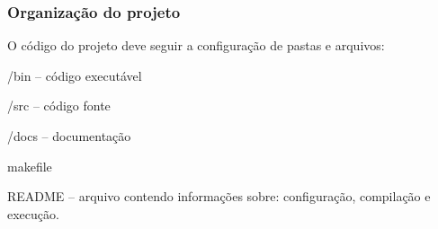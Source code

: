 \subsubsection*{Organização do projeto}

O código do projeto deve seguir a configuração de pastas e arquivos\+:
\begin{DoxyItemize}
\item /bin – código executável
\item /src – código fonte
\item /docs – documentação
\item makefile
\item R\+E\+A\+D\+ME – arquivo contendo informações sobre\+: configuração, compilação e execução. 
\end{DoxyItemize}